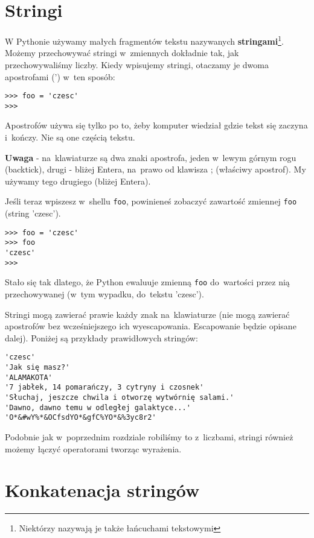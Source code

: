 \documentclass{book}
\begin{document}
\section{Stringi}

W Pythonie używamy małych fragmentów tekstu nazywanych {\bf stringami}\footnote{Niektórzy nazywają je także łańcuchami tekstowymi}. Możemy przechowywać stringi w~zmiennych dokładnie tak, jak przechowywaliśmy liczby. Kiedy wpisujemy stringi, otaczamy je dwoma apostrofami (') w~ten sposób:

\begin{lstlisting}
>>> foo = 'czesc'
>>>
\end{lstlisting}

Apostrofów używa się tylko po to, żeby komputer wiedział gdzie tekst się zaczyna i~kończy. Nie są one częścią tekstu.

{\bf Uwaga} - na~klawiaturze są dwa znaki apostrofa, jeden w~lewym górnym rogu (backtick), drugi - bliżej Entera, na~prawo od klawisza ; (właściwy apostrof). My używamy tego drugiego (bliżej Entera).

Jeśli teraz wpiszesz w~shellu \lstinline{foo}, powinieneś zobaczyć zawartość zmiennej \lstinline{foo} (string 'czesc'). 


\begin{lstlisting}
>>> foo = 'czesc'
>>> foo
'czesc'
>>>
\end{lstlisting}

Stało się tak dlatego, że Python ewaluuje zmienną \lstinline{foo} do~wartości przez nią przechowywanej (w~tym wypadku, do~tekstu 'czesc').

Stringi mogą zawierać prawie każdy znak na~klawiaturze (nie mogą zawierać apostrofów bez wcześniejszego ich wyescapowania. Escapowanie będzie opisane dalej). Poniżej są przykłady prawidłowych stringów:

\begin{lstlisting}
'czesc'
'Jak się masz?'
'ALAMAKOTA'
'7 jabłek, 14 pomarańczy, 3 cytryny i czosnek'
'Słuchaj, jeszcze chwila i otworzę wytwórnię salami.'
'Dawno, dawno temu w odległej galaktyce...'
'O*&#wY%*&OCfsdYO*&gfC%YO*&%3yc8r2'
\end{lstlisting}

Podobnie jak w~poprzednim rozdziale robiliśmy to z~liczbami, stringi również możemy łączyć operatorami tworząc wyrażenia.

\section{Konkatenacja stringów}
\end{document}
